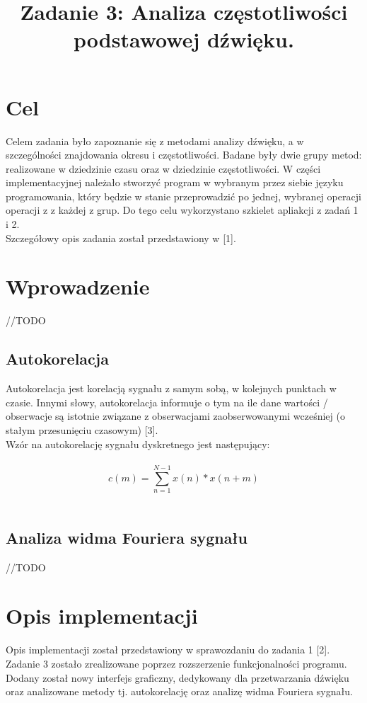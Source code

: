 \documentclass{classrep}
\author{
  \studentinfo{Jakub Antosik}{206788} \and
  \studentinfo{Andrzej Lisowski}{206807} 
}
\title{Zadanie 3: Analiza częstotliwości podstawowej dźwięku.}
\begin{document}
\maketitle

\section{Cel}
Celem zadania było zapoznanie się z metodami analizy dźwięku, a w szczególności znajdowania okresu i częstotliwości. Badane były dwie grupy metod: realizowane w dziedzinie czasu oraz w dziedzinie częstotliwości. W części implementacyjnej należało stworzyć program w wybranym przez siebie języku programowania, który będzie w stanie przeprowadzić po jednej, wybranej operacji operacji z z każdej z grup. Do tego celu wykorzystano szkielet apliakcji z zadań 1 i 2.\\
\indent
Szczegółowy opis zadania został przedstawiony w [1].

\section{Wprowadzenie}
//TODO

\subsection{Autokorelacja}
Autokorelacja jest korelacją sygnału z samym sobą, w kolejnych punktach w czasie. Innymi słowy, autokorelacja informuje o tym na ile dane wartości / obserwacje są istotnie związane z obserwacjami zaobserwowanymi wcześniej (o stałym przesunięciu czasowym) [3].\\
\indent
Wzór na autokorelację sygnału dyskretnego jest następujący:\\
\\
\[ c(m) = \sum_{n = 1}^{N - 1} x(n) \ast x(n + m) \]
\\

\subsection{Analiza widma Fouriera sygnału}
//TODO

\section{Opis implementacji}
Opis implementacji został przedstawiony w sprawozdaniu do zadania 1 [2]. Zadanie 3 zostało zrealizowane poprzez rozszerzenie funkcjonalności programu. Dodany został nowy interfejs graficzny, dedykowany dla przetwarzania dźwięku oraz analizowane metody tj. autokorelację oraz analizę widma Fouriera sygnału.
\end{document}
